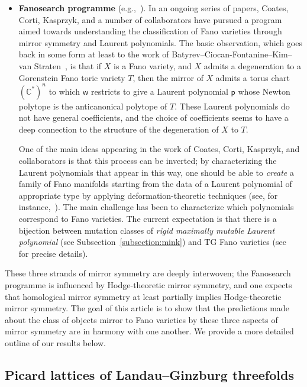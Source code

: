 \documentclass[10pt]{amsart}
\numberwithin{equation}{section}
\theoremstyle{plain}
\theoremstyle{definition}
\theoremstyle{remark}
\begin{document}
\begin{itemize}[\quad -]
\item \textbf{Fanosearch programme} (e.g.,~\cite{coates2014mirror,coates2016quantum,coates2021maximally}). In an ongoing series of papers, Coates, Corti, Kasprzyk, and a number of collaborators have pursued a program aimed towards understanding the classification of Fano varieties through mirror symmetry and Laurent polynomials. The basic observation, which goes back in some form at least to the work of Batyrev--Ciocan-Fontanine--Kim--van Straten~\cite{batyrev2000mirror}, is that if \(X\) is a Fano variety, and \(X\) admits a degeneration to a Gorenstein Fano toric variety \(T\), then the mirror of \(X\) admits a torus chart \((\mathbb{C}^*)^n\) to which \(\mathsf{w}\) restricts to give a Laurent polynomial \(\mathsf{p}\) whose Newton polytope is the anticanonical polytope of \(T\). These Laurent polynomials do not have general coefficients, and the choice of coefficients seems to have a deep connection to the structure of the degeneration of \(X\) to \(T\).

  One of the main ideas appearing in the work of Coates, Corti, Kasprzyk, and collaborators is that this process can be inverted; by characterizing the Laurent polynomials that appear in this way, one should be able to \emph{create} a family of Fano manifolds starting from the data of a Laurent polynomial of appropriate type by applying deformation-theoretic techniques (see, for instance,~\cite{coates2019inversion,akhtar2016mirror}). The main challenge has been to characterize which polynomials correspond to Fano varieties. The current expectation is that there is a bijection between mutation classes of \emph{rigid maximally mutable Laurent polynomial} (see Subsection~\ref{subsection:mink}) and TG Fano varieties (see~\cite{coates2021maximally} for precise details).
\end{itemize}

These three strands of mirror symmetry are deeply interwoven; the Fanosearch programme is influenced by Hodge-theoretic mirror symmetry, and one expects that homological mirror symmetry at least partially implies Hodge-theoretic mirror symmetry. The goal of this article is to show that the predictions made about the class of objects mirror to Fano varieties by these three aspects of mirror symmetry are in harmony with one another. We provide a more detailed outline of our results below.

\subsection{Picard lattices of Landau--Ginzburg threefolds}
\end{document}
